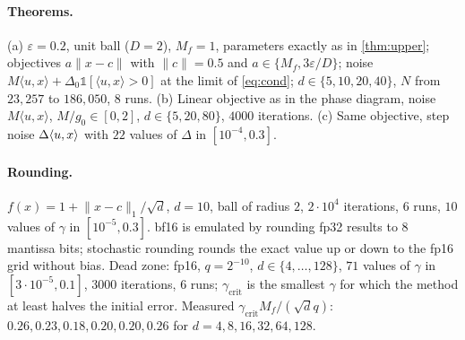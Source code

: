 \documentclass{article} %
\renewcommand{\eps}{\varepsilon}
\newcommand{\ip}[2]{\langle #1,#2\rangle}
\newcommand{\norm}[1]{\lVert #1\rVert}
\let\sign\relax\DeclareMathOperator{\sign}{sign}
\theoremstyle{plain}
\theoremstyle{definition}
\theoremstyle{remark}
\begin{document}
\paragraph{Theorems.} (a) $\eps=0.2$, unit ball ($D=2$), $M_f=1$, parameters exactly as in \cref{thm:upper}; objectives $a\norm{x-c}$ with $\norm c=0.5$ and $a\in\{M_f,3\eps/D\}$; noise $M\ip ux+\Delta_0\mathbb 1[\ip ux>0]$ at the limit of \eqref{eq:cond}; $d\in\{5,10,20,40\}$, $N$ from $23{,}257$ to $186{,}050$, $8$ runs. (b) Linear objective as in the phase diagram, noise $M\ip ux$, $M/g_0\in[0,2]$, $d\in\{5,20,80\}$, $4000$ iterations. (c) Same objective, step noise $\Delta\sign\ip ux$ with $22$ values of $\Delta$ in $[10^{-4},0.3]$.

\paragraph{Rounding.} $f(x)=1+\norm{x-c}_1/\sqrt d$, $d=10$, ball of radius $2$, $2\cdot10^4$ iterations, $6$ runs, $10$ values of $\gamma$ in $[10^{-5},0.3]$. bf16 is emulated by rounding fp32 results to 8 mantissa bits; stochastic rounding rounds the exact value up or down to the fp16 grid without bias. Dead zone: fp16, $q=2^{-10}$, $d\in\{4,\dots,128\}$, $71$ values of $\gamma$ in $[3\cdot10^{-5},0.1]$, $3000$ iterations, $6$ runs; $\gamma_{\mathrm{crit}}$ is the smallest $\gamma$ for which the method at least halves the initial error. Measured $\gamma_{\mathrm{crit}}M_f/(\sqrt dq)$: $0.26, 0.23, 0.18, 0.20, 0.20, 0.26$ for $d=4,8,16,32,64,128$.
\end{document}
